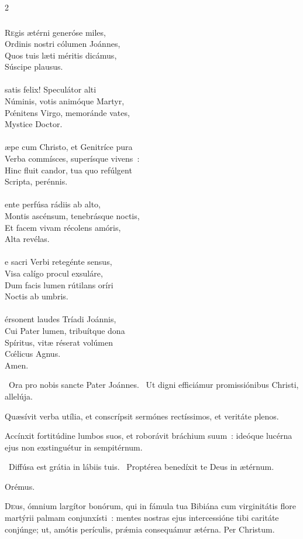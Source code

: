 \documentclass[9pt,twoside]{extarticle}
\begin{document}
\begin{multicols}{2}
\subsubsection*{\center{}}
\lettrine{R}egis ætérni generóse miles,\\ Ordinis nostri cólumen Joánnes,\\ Quos tuis læti méritis dicámus,\\ Súscipe plausus.\\
\\ 
 satis felix! Speculátor alti\\ Núminis, votis animóque Martyr,\\ Pœ́nitens Virgo, memoránde vates,\\ Mystice Doctor.\\
\\
æpe cum Christo, et Genitríce pura\\ Verba commísces, superísque vivens~:\\ Hinc fluit candor, tua quo refúlgent\\ Scripta, perénnis.\\
\\
ente perfúsa rádiis ab alto,\\ Montis ascénsum, tenebrásque noctis,\\ Et facem vivam récolens amóris,\\ Alta revélas.\\
\\
e sacri Verbi retegénte sensus,\\ Visa calígo procul exsuláre,\\ Dum facis lumen rútilans oríri\\ Noctis ab umbris.\\
\\
érsonent laudes Tríadi Joánnis,\\ Cui Pater lumen, tribuítque dona\\ Spíritus, vitæ réserat volúmen\\ Cœ́licus Agnus.\\
Amen.
\begin{tightlist}{}
\item {}~Ora pro nobis sancte Pater Joánnes. ~Ut digni efficiámur promissiónibus Christi, allelúja. 
\item {} Quæsívit verba utília, et conscrípsit sermónes rectíssimos, et veritáte plenos.
\item {} Accínxit fortitúdine lumbos suos, et roborávit bráchium suum~: ideóque lucérna ejus non exstinguétur in sempitérnum.
\item {}~Diffúsa est grátia in lábiis tuis. ~Proptérea benedíxit te Deus in ætérnum.
\item Orémus. \hfill {}
\end{tightlist}
\lettrine{D}eus, ómnium largítor bonórum, qui in fámula tua Bibiána cum virginitátis flore martýrii palmam conjunxísti~: mentes nostras ejus intercessióne tibi caritáte conjúnge; ut, amótis perículis, prǽmia consequámur ætérna. Per Christum.


\end{multicols}
\end{document}
